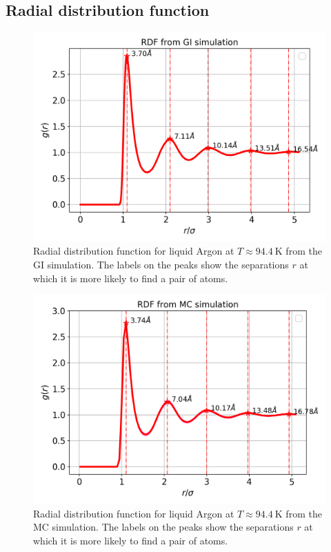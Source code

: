 \documentclass[%
aps,
pra,%
amsmath,amssymb,
preprint,%
reprint,%
notitlepage,
a4paper]{revtex4-1}
\begin{document}
\subsection{Radial distribution function}
\begin{figure}[t]
	\centering
	\includegraphics[width=0.99\linewidth]{../task2/results/gofr}
	\caption{Radial distribution function for liquid Argon at $T\approx\SI{94.4}{\kelvin}$ from the GI simulation. The labels on the peaks show the separations $r$ at which it is more likely to find a pair of atoms.}
	\label{fig:gofr}
\end{figure}
\begin{figure}[t]
	\centering
	\includegraphics[width=0.99\linewidth]{../task2/results/gofr_mc}
	\caption{Radial distribution function for liquid Argon at $T\approx\SI{94.4}{\kelvin}$ from the MC simulation. The labels on the peaks show the separations $r$ at which it is more likely to find a pair of atoms.}
	\label{fig:gofr_mc}
\end{figure}
\end{document}
